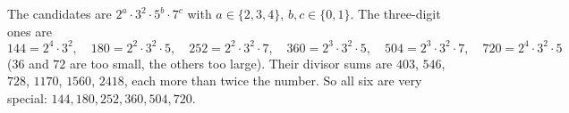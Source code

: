 The candidates are $2^a\cdot3^2\cdot5^b\cdot7^c$ with $a\in\{2,3,4\}$, $b,c\in\{0,1\}$. The three-digit ones are
\[144=2^4\cdot3^2,\quad180=2^2\cdot3^2\cdot5,\quad252=2^2\cdot3^2\cdot7,\quad360=2^3\cdot3^2\cdot5,\quad504=2^3\cdot3^2\cdot7,\quad720=2^4\cdot3^2\cdot5\]
($36$ and $72$ are too small, the others too large). Their divisor sums are $403$, $546$, $728$, $1170$, $1560$, $2418$, each more than twice the number. So all six are very special: $\boxed{144,180,252,360,504,720}$.
